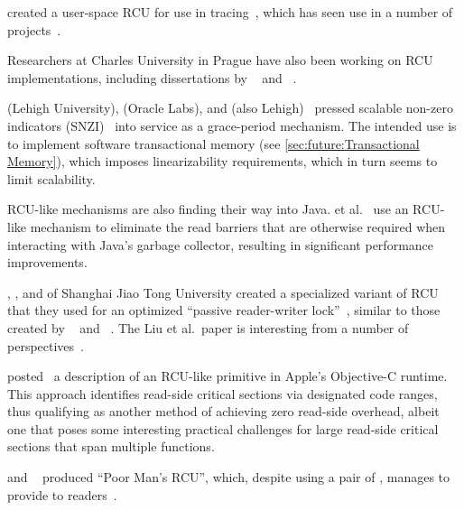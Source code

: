  created a user-space RCU for use in
tracing~\cite{MathieuDesnoyers2009URCU,MathieuDesnoyersPhD,MathieuDesnoyers2012URCU},
which has seen use in a number of projects~\cite{MikeDay2013RCUqemu}.

Researchers at Charles University in Prague have also been
working on RCU implementations, including dissertations by
~\cite{AndrejPodzimek2010masters} and
~\cite{AdamHraska2013RCUHelenOS}.

 (Lehigh University),  (Oracle Labs), and
 (also Lehigh)~\cite{Liu:2013:MSA:2549695.2549732}
pressed scalable non-zero indicators
(SNZI)~\cite{FaithEllen:2007:SNZI} into service as a grace-period
mechanism.
The intended use is to implement software transactional memory
(see \cref{sec:future:Transactional Memory}), which
imposes linearizability requirements, which in turn seems to
limit scalability.

RCU-like mechanisms are also finding their way into Java.
 et al.~\cite{Sivaramakrishnan:2012:ERB:2258996.2259005}
use an RCU-like mechanism to eliminate the read barriers that are
otherwise required when interacting with Java's garbage collector,
resulting in significant performance improvements.

, , and  of
Shanghai Jiao Tong University
created a specialized variant of RCU that they used for an optimized
``passive reader-writer lock''~\cite{RanLiu2014PassiveRWLock}, similar to
those created by ~\cite{GauthamShenoy2006RCUrwlock} and
~\cite{SrivatsaSBhat2014RCUrwlock}.
The Liu et al.\ paper is interesting from a number of
perspectives~\cite{PaulEMcKenney2014ReadMostly}.

 posted~\cite{MikeAsh2015Apple} a description of an RCU-like
primitive in Apple's Objective-C runtime.
This approach identifies read-side critical sections via designated
code ranges, thus qualifying as another method of achieving
zero read-side overhead, albeit one that poses some interesting
practical challenges for large read-side critical sections that
span multiple functions.

 and ~\cite{PedroRmalhete2015PoorMansRCU}
produced ``Poor Man's RCU'', which, despite using a pair of
, manages to provide 
 to
readers~\cite{PaulEMcKenney2015ReadMostly}.

